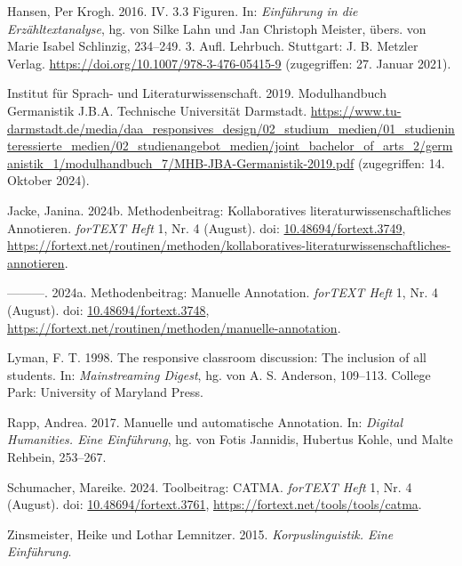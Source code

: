 \documentclass[
          a4paper,
        ]{article}
\newlength{\cslhangindent}
\newenvironment{CSLReferences}[2] %
 {\begin{list}{}{%
  \setlength{\itemindent}{0pt}
  \setlength{\leftmargin}{0pt}
  \setlength{\parsep}{0pt}
  \ifodd #1
   \setlength{\leftmargin}{\cslhangindent}
   \setlength{\itemindent}{-1\cslhangindent}
  \fi
  \setlength{\itemsep}{#2\baselineskip}}}
 {\end{list}}
\begin{document}
\begin{CSLReferences}{1}{0}
Hansen, Per Krogh. 2016. {IV}. 3.3 {Figuren}. In: \emph{Einführung in
die {Erzähltextanalyse}}, hg. von Silke Lahn und Jan Christoph Meister,
übers. von Marie Isabel Schlinzig, 234--249. 3. Aufl. Lehrbuch.
Stuttgart: J. B. Metzler Verlag.
\url{https://doi.org/10.1007/978-3-476-05415-9} (zugegriffen: 27. Januar
2021).

Institut für Sprach- und Literaturwissenschaft. 2019. Modulhandbuch
{Germanistik} {J}.{B}.{A}. Technische Universität Darmstadt.
\url{https://www.tu-darmstadt.de/media/daa_responsives_design/02_studium_medien/01_studieninteressierte_medien/02_studienangebot_medien/joint_bachelor_of_arts_2/germanistik_1/modulhandbuch_7/MHB-JBA-Germanistik-2019.pdf}
(zugegriffen: 14. Oktober 2024).

Jacke, Janina. 2024b. Methodenbeitrag: {Kollaboratives}
literaturwissenschaftliches {Annotieren}. \emph{forTEXT Heft} 1, Nr. 4
(August). doi:
\href{https://doi.org/10.48694/fortext.3749}{10.48694/fortext.3749},
\url{https://fortext.net/routinen/methoden/kollaboratives-literaturwissenschaftliches-annotieren}.

---------. 2024a. Methodenbeitrag: {Manuelle} {Annotation}.
\emph{forTEXT Heft} 1, Nr. 4 (August). doi:
\href{https://doi.org/10.48694/fortext.3748}{10.48694/fortext.3748},
\url{https://fortext.net/routinen/methoden/manuelle-annotation}.

Lyman, F. T. 1998. The responsive classroom discussion: {The} inclusion
of all students. In: \emph{Mainstreaming {Digest}}, hg. von A. S.
Anderson, 109--113. College Park: University of Maryland Press.

Rapp, Andrea. 2017. Manuelle und automatische {Annotation}. In:
\emph{Digital {Humanities}. {Eine} {Einführung}}, hg. von Fotis
Jannidis, Hubertus Kohle, und Malte Rehbein, 253--267.

Schumacher, Mareike. 2024. Toolbeitrag: {CATMA}. \emph{forTEXT Heft} 1,
Nr. 4 (August). doi:
\href{https://doi.org/10.48694/fortext.3761}{10.48694/fortext.3761},
\url{https://fortext.net/tools/tools/catma}.

Zinsmeister, Heike und Lothar Lemnitzer. 2015. \emph{Korpuslinguistik.
{Eine} {Einführung}}.

\end{CSLReferences}
\end{document}

